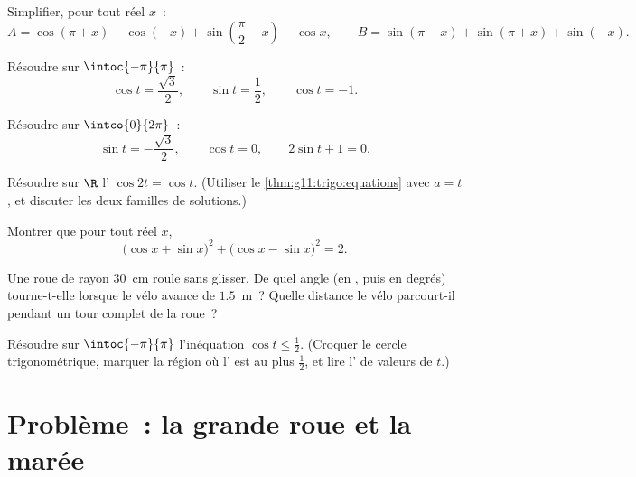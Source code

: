 \begin{exercise}[$\star\star$]\label{exo:g11:trigo:5}
Simplifier, pour tout réel $x$~:
\[
A = \cos(\pi + x) + \cos(-x) + \sin\left(\frac\pi2 - x\right) - \cos x,
\qquad
B = \sin(\pi - x) + \sin(\pi + x) + \sin(-x) .
\]
\end{exercise}

\begin{exercise}[$\star\star$]\label{exo:g11:trigo:6}
Résoudre sur $\intoc{-\pi}{\pi}$~:
\[
\cos t = \frac{\sqrt3}{2}, \qquad
\sin t = \frac12, \qquad
\cos t = -1 .
\]
\end{exercise}

\begin{exercise}[$\star\star$]\label{exo:g11:trigo:7}
Résoudre sur $\intco{0}{2\pi}$~:
\[
\sin t = -\frac{\sqrt3}{2}, \qquad
\cos t = 0, \qquad
2\sin t + 1 = 0 .
\]
\end{exercise}

\begin{exercise}[$\star\star$]\label{exo:g11:trigo:8}
Résoudre sur $\R$ l' $\cos 2t = \cos t$. (Utiliser le
\cref{thm:g11:trigo:equations} avec $a = t$, et discuter les deux
familles de solutions.)
\end{exercise}

\begin{exercise}[$\star\star$]\label{exo:g11:trigo:9}
Montrer que pour tout réel $x$,
\[
\bigl(\cos x + \sin x\bigr)^2 + \bigl(\cos x - \sin x\bigr)^2 = 2 .
\]
\end{exercise}

\begin{exercise}[$\star\star$]\label{exo:g11:trigo:10}
Une roue de rayon $30$~cm roule sans glisser. De quel angle (en ,
puis en degrés) tourne-t-elle lorsque le vélo avance de $1.5$~m~?
Quelle distance le vélo parcourt-il pendant un tour complet de la roue~?
\end{exercise}

\begin{exercise}[$\star\star\star$]\label{exo:g11:trigo:11}
Résoudre sur $\intoc{-\pi}{\pi}$ l'inéquation $\cos t \leq \frac12$.
(Croquer le cercle trigonométrique, marquer la région où l' est
au plus $\frac12$, et lire l' de valeurs de $t$.)
\end{exercise}

\section{Problème~: la grande roue et la marée}

